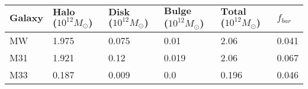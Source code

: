 \documentclass{article}
\begin{document}
\centering


\begin{table}
\begin{tabular}{|p{3cm}||p{3cm}|p{3cm}|p{3cm}|p{3cm}|p{3cm}|}
\hline
$\textbf{Galaxy}$ & $\textbf{Halo Mass}$ ($10^{12} M_{\odot}$) & $\textbf{Disk Mass}$ ($10^{12} M_{\odot}$) & $\textbf{Bulge Mass}$ ($10^{12} M_{\odot}$) & $\textbf{Total Mass}$ ($10^{12} M_{\odot}$) & $f_{bar}$ \\
\hline
MW & 1.975 & 0.075 & 0.01 & 2.06 & 0.041 \\
\hline
M31 & 1.921 & 0.12 & 0.019 & 2.06 & 0.067 \\
\hline
M33 & 0.187 & 0.009 & 0.0 & 0.196 & 0.046 \\
\hline
\end{tabular}
\end{table}
\end{document}
